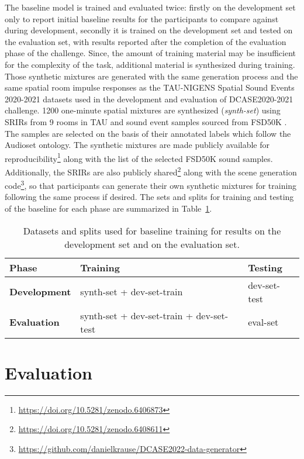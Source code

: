 \documentclass{article}
\begin{document}
\begin{sloppy}
The baseline model is trained and evaluated twice: firstly on the development set only to report initial baseline results for the participants to compare against during development, secondly it is trained on the development set and tested on the evaluation set, with results reported after the completion of the evaluation phase of the challenge. Since, the amount of training material may be insufficient for the complexity of the task, additional material is synthesized during training. Those synthetic mixtures are generated with the same generation process and the same spatial room impulse responses as the TAU-NIGENS Spatial Sound Events 2020-2021 datasets used in the development and evaluation of DCASE2020-2021 challenge. 1200 one-minute spatial mixtures are synthesized (\emph{synth-set}) using SRIRs from 9 rooms in TAU and sound event samples sourced from FSD50K \cite{fonseca2021fsd50k}. The samples are selected on the basis of their annotated labels which follow the Audioset ontology. The synthetic mixtures are made publicly available for reproducibility\footnote{\url{https://doi.org/10.5281/zenodo.6406873}} along with the list of the selected FSD50K sound samples. Additionally, the SRIRs are also publicly shared\footnote{\url{https://doi.org/10.5281/zenodo.6408611}} along with the scene generation code\footnote{\url{https://github.com/danielkrause/DCASE2022-data-generator}}, so that participants can generate their own synthetic mixtures for training following the same process if desired. The sets and splits for training and testing of the baseline for each phase are summarized in Table~\ref{tab:baseline_train}.

\begin{table}[ht]
\begin{adjustbox}{max width=\columnwidth}
\begin{tabular}{l|ll}
\textbf{Phase} & \textbf{Training} & \textbf{Testing} \\ \hline
\textbf{Development}  & synth-set + dev-set-train & dev-set-test \\
\textbf{Evaluation} & synth-set + dev-set-train + dev-set-test & eval-set  \\
\end{tabular}
\end{adjustbox}
\caption{Datasets and splits used for baseline training for results on the development set and on the evaluation set.}
\label{tab:baseline_train}
\end{table}

\section{Evaluation}
\label{sec:evaluation}


\end{sloppy}
\end{document}
